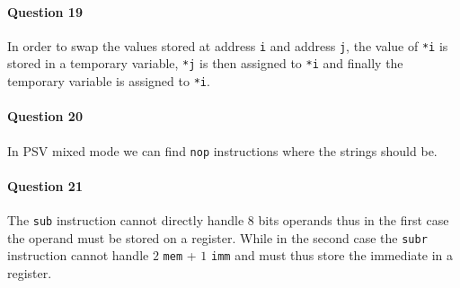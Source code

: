 \documentclass[10pt]{article}
\begin{document}
\paragraph{Question 19}
In order to swap the values stored at address \verb!i! and address \verb!j!, the value of \verb!*i! is stored in a temporary variable, \verb!*j! is then assigned to \verb!*i! and finally the temporary variable is assigned to \verb!*i!.

\paragraph{Question 20}
In PSV mixed mode we can find \verb!nop! instructions where the strings should be.

\paragraph{Question 21}
The \verb!sub! instruction cannot directly handle $8$ bits operands thus in the first case the operand must be stored on a register. While in the second case the \verb!subr! instruction cannot handle $2$ \verb!mem! + $1$ \verb!imm! and must thus store the immediate in a register.
\end{document}
